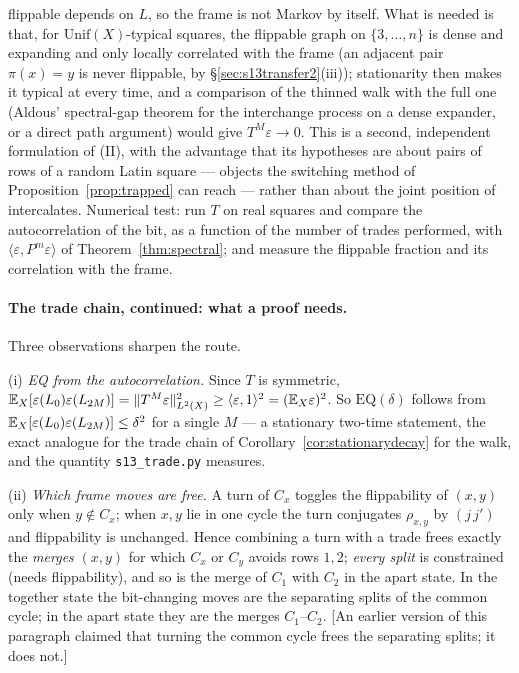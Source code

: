 flippable depends on $L$, so the frame is not Markov by itself.  What
is needed is that, for $\mathrm{Unif}(X)$-typical squares, the
flippable graph on $\{3,\dots,n\}$ is dense and expanding and only
locally correlated with the frame (an adjacent pair $\pi(x)=y$ is
never flippable, by \S\ref{sec:s13transfer2}(iii)); stationarity then
makes it typical at every time, and a comparison of the thinned walk
with the full one (Aldous' spectral-gap theorem for the interchange
process on a dense expander, or a direct path argument) would give
$T^M\varepsilon\to0$.  This is a second, independent formulation of
(II), with the advantage that its hypotheses are about pairs of rows
of a random Latin square --- objects the switching method of
Proposition~\ref{prop:trapped} can reach --- rather than about the
joint position of intercalates.  Numerical test: run $T$ on real
squares and compare the autocorrelation of the bit, as a function of
the number of trades performed, with $\langle\varepsilon,P^m\varepsilon\rangle$
of Theorem~\ref{thm:spectral}; and measure the flippable fraction and
its correlation with the frame.

\paragraph{The trade chain, continued: what a proof needs.}  Three
observations sharpen the route.

(i) \emph{EQ from the autocorrelation.}  Since $T$ is symmetric,
$\mathbb{E}_X[\varepsilon(L_0)\varepsilon(L_{2M})]=\|T^M\varepsilon\|^2_{L^2(X)}\ge\langle\varepsilon,1\rangle^2=(\mathbb{E}_X\varepsilon)^2$.
So $\mathrm{EQ}(\delta)$ follows from
$\mathbb{E}_X[\varepsilon(L_0)\varepsilon(L_{2M})]\le\delta^2$ for a single $M$ ---
a stationary two-time statement, the exact analogue for the trade chain
of Corollary~\ref{cor:stationarydecay} for the walk, and the quantity
\texttt{s13\_trade.py} measures.

(ii) \emph{Which frame moves are free.}  A turn of $C_x$ toggles the
flippability of $(x,y)$ only when $y\notin C_x$; when $x,y$ lie in one
cycle the turn conjugates $\rho_{x,y}$ by $(j\,j')$ and flippability is
unchanged.  Hence combining a turn with a trade frees exactly the
\emph{merges} $(x,y)$ for which $C_x$ or $C_y$ avoids rows $1,2$;
\emph{every split} is constrained (needs flippability), and so is the
merge of $C_1$ with $C_2$ in the apart state.  In the together state
the bit-changing moves are the separating splits of the common cycle;
in the apart state they are the merges $C_1$--$C_2$.  [An earlier
version of this paragraph claimed that turning the common cycle frees
the separating splits; it does not.]

